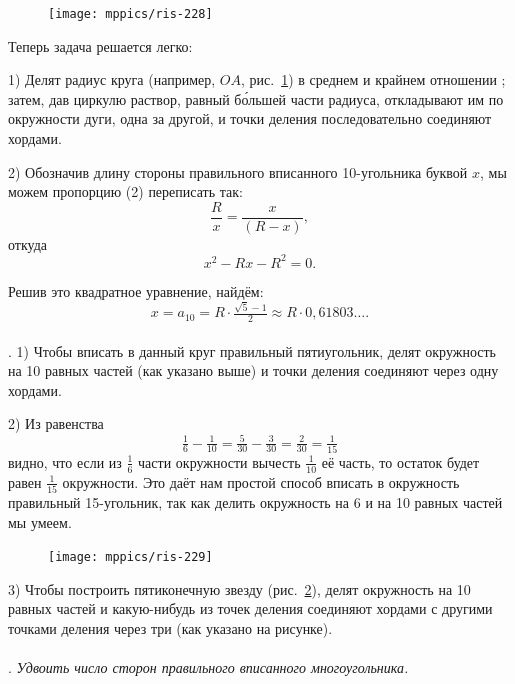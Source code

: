 \documentclass[oneside]{book}
\begin{document}
\begin{figure}
\centering
\texttt{[image: mppics/ris-228]}
\caption{}\label{1938/ris-228}
\end{figure}

Теперь задача решается легко:

1) Делят радиус круга (например, $OA$, рис.~\ref{1938/ris-228}) в среднем и крайнем отношении%
;
затем, дав циркулю раствор, равный б\'{о}льшей части радиуса, откладывают им по окружности дуги, одна за другой, и точки деления последовательно соединяют хордами.

2) Обозначив длину стороны правильного вписанного 10-угольника буквой $x$, мы можем пропорцию (2) переписать так:
\[\frac Rx=\frac x{(R-x)},\]
откуда
\[x^2-Rx-R^2=0.\]

Решив это квадратное уравнение, найдём:
\[x=a_{10}=R\cdot\tfrac{\sqrt5-1}{2}\approx R \cdot  0{,}61803\dots.\]

\paragraph{}\label{1938/223}
.
1) Чтобы вписать в данный круг правильный пятиугольник, делят окружность на 10 равных частей (как указано выше) и точки деления соединяют через одну хордами.

2) Из равенства
\[\tfrac16-\tfrac1{10}=\tfrac5{30}-\tfrac3{30}=\tfrac2{30}=\tfrac1{15}\]
видно, что если из $\tfrac16$ части окружности вычесть $\tfrac1{10}$ её часть, то остаток будет равен $\tfrac1{15}$ окружности.
Это даёт нам простой способ вписать в окружность правильный 15-угольник, так как делить окружность на 6 и на 10 равных частей мы умеем.

\begin{figure}
\centering
\texttt{[image: mppics/ris-229]}
\caption{}\label{1938/ris-229}
\end{figure}

3) Чтобы построить пятиконечную звезду (рис.~\ref{1938/ris-229}), делят окружность на 10 равных частей и какую-нибудь из точек деления соединяют хордами с другими точками деления через три (как указано на рисунке).

\paragraph{}\label{1938/224}
\mbox{.}
\emph{Удвоить число сторон правильного вписанного многоугольника.}
\end{document}
